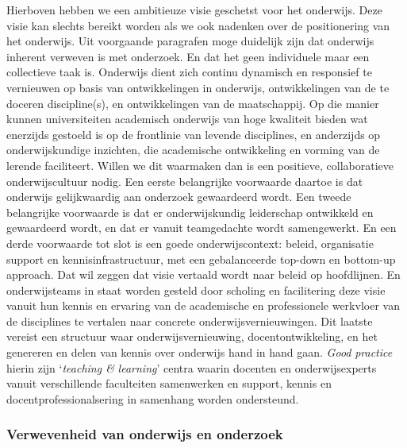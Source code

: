 \documentclass[smallauthor, chapterhaspagenum, nochapterinheader, pagenuminheader,  bigchapnum,medium2, tocpages,  garamond, titleinheader]{jote-book}
\begin{document}
	Hierboven hebben we een ambitieuze visie geschetst voor het onderwijs. Deze visie kan slechts bereikt worden als we ook nadenken over de positionering van het onderwijs. Uit voorgaande paragrafen moge duidelijk zijn dat onderwijs inherent verweven is met onderzoek. En dat het geen individuele maar een collectieve taak is. Onderwijs dient zich continu dynamisch en responsief te vernieuwen op basis van ontwikkelingen in onderwijs, ontwikkelingen van de te doceren discipline(s), en ontwikkelingen van de maatschappij. Op die manier kunnen universiteiten academisch onderwijs van hoge kwaliteit bieden wat enerzijds gestoeld is op de frontlinie van levende disciplines, en anderzijds op onderwijskundige inzichten, die academische ontwikkeling en vorming van de lerende faciliteert. Willen we dit waarmaken dan is een positieve, collaboratieve onderwijscultuur nodig. Een eerste belangrijke voorwaarde daartoe is dat onderwijs gelijkwaardig aan onderzoek gewaardeerd wordt. Een tweede belangrijke voorwaarde is dat er onderwijskundig leiderschap ontwikkeld en gewaardeerd wordt, en dat er vanuit teamgedachte wordt samengewerkt. En een derde voorwaarde tot slot is een goede onderwijscontext: beleid, organisatie support en kennisinfrastructuur, met een gebalanceerde top-down en bottom-up approach. Dat wil zeggen dat visie vertaald wordt naar beleid op hoofdlijnen. En onderwijsteams in staat worden gesteld door scholing en facilitering deze visie vanuit hun kennis en ervaring van de academische en professionele werkvloer van de disciplines te vertalen naar concrete onderwijsvernieuwingen. Dit laatste vereist een structuur waar onderwijsvernieuwing, docentontwikkeling, en het genereren en delen van kennis over onderwijs hand in hand gaan. \emph{Good}\emph{ }\emph{practice} hierin zijn ‘\emph{teaching \& }\emph{learning}' centra waarin docenten en onderwijsexperts vanuit verschillende faculteiten samenwerken en support, kennis en docentprofessionalsering in samenhang worden ondersteund.



	\subsubsection{Verwevenheid van onderwijs en onderzoek}
\end{document}
